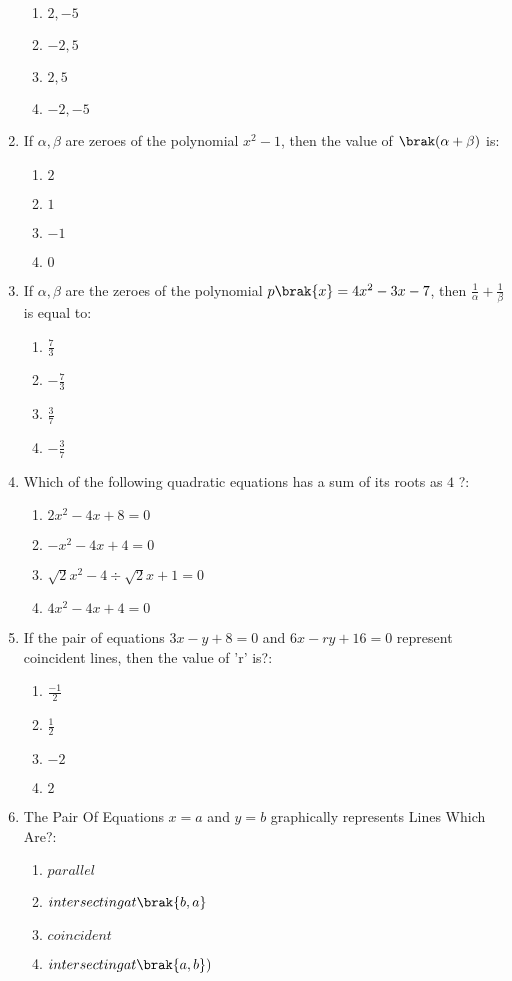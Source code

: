 \begin{enumerate}
\begin{enumerate}
    \item$2, -5$
    \item $-2, 5$
    \item $2, 5$
    \item $-2, -5$
\end{enumerate}
\item If $\alpha, \beta$ are zeroes of the polynomial $x^2 - 1$, then the value of $\brak(\alpha + \beta)$ is:

\begin{enumerate}
    \item $2$
    \item $1$
    \item $-1$
    \item $0$
\end{enumerate}
\item If $ \alpha, \beta $ are the zeroes of the polynomial $ p\brak{x} = 4x^2 - 3x - 7 $, then $ \frac{1}{\alpha} + \frac{1}{\beta} $ is equal to:

\begin{enumerate}
    \item $\frac{7}{3}$
    \item$-\frac{7}{3}$
    \item $\frac{3}{7}$
    \item $-\frac{3}{7}$
\end{enumerate}


\item Which of the following quadratic equations has a sum of its roots as  $4$ ?:  
\begin{enumerate}
\item $ 2x^2 - 4x + 8 = 0 $                          
\item $ -x^2 - 4x + 4 = 0 $                          
\item $ \sqrt{2}x^2 - 4 \div \sqrt{2}x + 1 = 0 $
\item $ 4x^2 - 4x + 4 = 0 $
\end{enumerate}
\item If the pair of equations $3x - y + 8 = 0$ and $6x - ry + 16 = 0$ represent coincident lines, then the value of 'r' is?:                          
\begin{enumerate}        
\item $ \frac{-1}{2} $                        
\item $ \frac{1}{2} $                        
\item $ -2 $      
\item $ 2 $
\end{enumerate}	
\item The Pair Of Equations $x=a$ and $y=b$ graphically represents Lines Which Are?:    
    \begin{enumerate}
    \item $ parallel $                                  
    \item $ intersecting at \brak{b,a} $                                
    \item $ coincident $    
    \item $ intersecting at \brak{a,b}) $
    \end{enumerate}


\end{enumerate}
